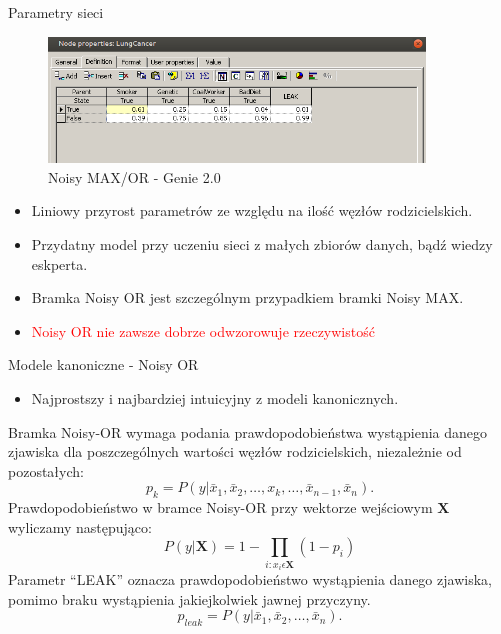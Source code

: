 \documentclass{beamer}
\begin{document}
\begin{frame}{Parametry sieci}
	\begin{figure}[h!]
		\centering
		\includegraphics[width=10cm]{3.png}
		\caption{Noisy MAX/OR - Genie 2.0}
	\end{figure}

	\begin{itemize}
		\item Liniowy przyrost parametrów ze względu na ilość węzłów rodzicielskich.
		\item Przydatny model przy uczeniu sieci z małych zbiorów danych, bądź wiedzy eskperta.
		\item Bramka Noisy OR jest szczególnym przypadkiem bramki Noisy MAX.
        \item \textcolor{red}{Noisy OR nie zawsze dobrze odwzorowuje rzeczywistość}
	\end{itemize}
\end{frame}

\begin{frame}{Modele kanoniczne - Noisy OR}
	\begin{itemize}
		\item Najprostszy i najbardziej intuicyjny z modeli kanonicznych.
	\end{itemize}
	Bramka Noisy-OR wymaga podania prawdopodobieństwa wystąpienia danego zjawiska dla poszczególnych wartości węzłów rodzicielskich, niezależnie od pozostałych:
	\begin{equation}
		p_k = P(y|\bar{x}_1, \bar{x}_2, \ldots , x_k, \ldots , \bar{x}_{n-1}, \bar{x}_n).
	\end{equation}
	Prawdopodobieństwo w bramce Noisy-OR przy wektorze wejściowym $\textbf{X}$ wyliczamy następująco:
	\begin{equation}
		P(y|\textbf{X}) = 1 - \prod_{i:x_i\epsilon \textbf{X}}(1-p_i)
	\end{equation}
	Parametr ``LEAK'' oznacza prawdopodobieństwo wystąpienia danego zjawiska, pomimo braku wystąpienia jakiejkolwiek jawnej przyczyny.
	\begin{equation}
		p_{leak} = P(y|\bar{x}_1, \bar{x}_2, \ldots , \bar{x}_n).
	\end{equation}
\end{frame}
\end{document}
